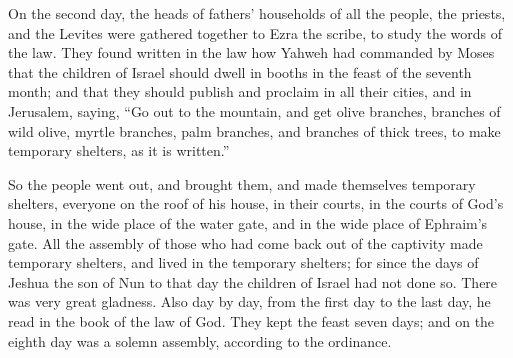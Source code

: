 {\par }{\PP {}On the second day, the heads of fathers’ households of all the people, the priests, and the Levites were gathered together to Ezra the scribe, to study the words of the law.
They found written in the law how Yahweh had commanded by Moses that the children of Israel should dwell in booths in the feast of the seventh month;
and that they should publish and proclaim in all their cities, and in Jerusalem, saying, “Go out to the mountain, and get olive branches, branches of wild olive, myrtle branches, palm branches, and branches of thick trees, to make temporary shelters, as it is written.”
\par }{\PP {}So the people went out, and brought them, and made themselves temporary shelters, everyone on the roof of his house, in their courts, in the courts of God’s house, in the wide place of the water gate, and in the wide place of Ephraim’s gate.
All the assembly of those who had come back out of the captivity made temporary shelters, and lived in the temporary shelters; for since the days of Jeshua the son of Nun to that day the children of Israel had not done so. There was very great gladness.
Also day by day, from the first day to the last day, he read in the book of the law of God. They kept the feast seven days; and on the eighth day was a solemn assembly, according to the ordinance.

}
